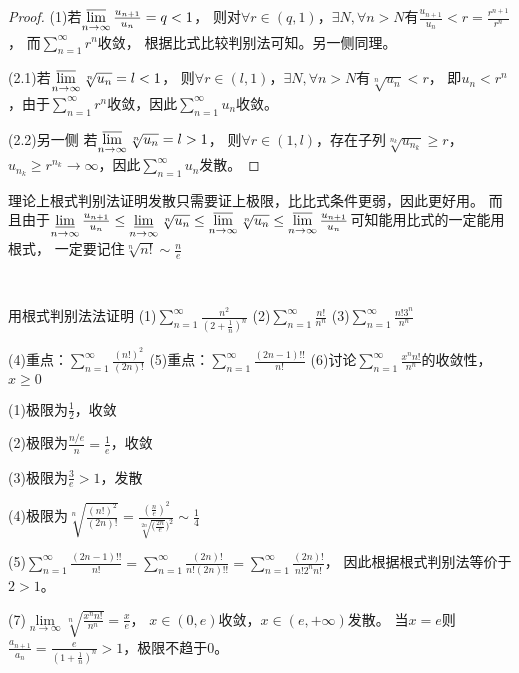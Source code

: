 \begin{proof}
  (1)若$\varlimsup \limits_{n \rightarrow \infty}\frac{u_{n+1}}{u_n} = q < 1$，
  则对$\forall r \in (q,1)$，$\exists N, \forall n > N$有$\frac{u_{n+1}}{u_n} < r = \frac{r^{n+1}}{r^n}$，
  而$\sum\limits_{n = 1}^{\infty}r^n$收敛，
  根据比式比较判别法可知。另一侧同理。

  (2.1)若$\varlimsup \limits _{n \rightarrow \infty}\sqrt[n]{u_n} = l < 1$，
  则$\forall r \in (l,1)$，$\exists N, \forall n > N$有$\sqrt[n]{u_n} < r$，
  即$u_n < r^n$，由于$\sum\limits_{n = 1}^{\infty}r^n$收敛，因此$\sum\limits_{n = 1}^{\infty}u_n$收敛。

  (2.2)另一侧
  若$\varlimsup \limits _{n \rightarrow \infty}\sqrt[n]{u_n} = l > 1$，
  则$\forall r \in (1,l)$，存在子列$\sqrt[n_k]{u_{n_k}} \geq r$，
  $u_{n_k} \geq r^{n_k} \rightarrow \infty$，因此$\sum\limits_{n = 1}^{\infty}u_n$发散。
\end{proof}

\begin{note}
  理论上根式判别法证明发散只需要证上极限，比比式条件更弱，因此更好用。
  而且由于$\varliminf \limits_{n \rightarrow \infty}\frac{u_{n+1}}{u_n} \leq \varliminf\limits_{n \rightarrow \infty}\sqrt[n]{u_n} \leq \varlimsup \limits_{n \rightarrow \infty}\sqrt[n]{u_n} \leq \varlimsup\limits_{n \rightarrow \infty}\frac{u_{n+1}}{u_n}$可知能用比式的一定能用根式，
  一定要记住$\sqrt[n]{n!} \sim \frac{n}{e}$
\end{note}

~

\begin{exercise}[使用根式判别法]
  用根式判别法法证明
  (1)$\sum\limits_{n = 1}^{\infty}\frac{n^2}{(2 + \frac{1}{n})^n}$
  (2)$\sum\limits_{n = 1}^{\infty}\frac{n!}{n^n}$
  (3)$\sum\limits_{n = 1}^{\infty}\frac{n! 3^n}{n^n}$

  (4)重点：$\sum\limits_{n = 1}^{\infty}\frac{(n!)^2}{(2n)!}$
  (5)重点：$\sum\limits_{n = 1}^{\infty}\frac{(2n-1)!!}{n!}$
  (6)讨论$\sum\limits_{n = 1}^{\infty}\frac{x^n n!}{n^n}$的收敛性，$x \geq 0$
\end{exercise}

\begin{solution}
  (1)极限为$\frac{1}{2}$，收敛

  (2)极限为$\frac{n/e}{n} = \frac{1}{e}$，收敛

  (3)极限为$\frac{3}{e} > 1$，发散

  (4)极限为$\sqrt[n]{\frac{(n!)^2}{(2n)!}}  = \frac{(\frac{n}{e})^2}{\sqrt[2n]{(\frac{2n}{e}})^2} \sim \frac{1}{4}$

  (5)$\sum\limits_{n = 1}^{\infty}\frac{(2n - 1)!!}{n!} = \sum\limits_{n = 1}^{\infty}\frac{(2n)!}{n!(2n)!!} = \sum\limits_{n = 1}^{\infty}\frac{(2n)!}{n!2^n n!}$，
  因此根据根式判别法等价于$2 > 1$。

  (7)$\lim \limits _{n \rightarrow \infty} \sqrt[n]{\frac{x^nn!}{n^n}} = \frac{x}{e}$，
  $x \in (0,e)$收敛，$x \in (e,+\infty)$发散。
  当$x = e$则$\frac{a_{n+1}}{a_n} = \frac{e}{(1 + \frac{1}{n})^n} > 1$，极限不趋于$0$。
\end{solution}

